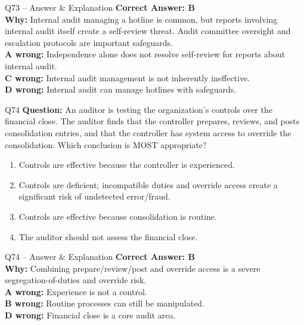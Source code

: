 \documentclass[aspectratio=169,10pt]{beamer}
\begin{document}
	\begin{frame}[t]{Q73 -- Answer \& Explanation}
		\small
		\textbf{Correct Answer: B} \\[4pt]
		\textbf{Why:} Internal audit managing a hotline is common, but reports involving internal audit itself create a self-review threat. Audit committee oversight and escalation protocols are important safeguards. \\[4pt]
		\textbf{A wrong:} Independence alone does not resolve self-review for reports about internal audit. \\[2pt]
		\textbf{C wrong:} Internal audit management is not inherently ineffective. \\[2pt]
		\textbf{D wrong:} Internal audit can manage hotlines with safeguards.
	\end{frame}
	
	\begin{frame}[t]{Q74}
		\small
		\textbf{Question:} An auditor is testing the organization's controls over the financial close. The auditor finds that the controller prepares, reviews, and posts consolidation entries, and that the controller has system access to override the consolidation. Which conclusion is MOST appropriate?
		\begin{enumerate}[label=\Alph*.,itemsep=1pt,topsep=2pt]
			\item Controls are effective because the controller is experienced.
			\item Controls are deficient; incompatible duties and override access create a significant risk of undetected error/fraud.
			\item Controls are effective because consolidation is routine.
			\item The auditor should not assess the financial close.
		\end{enumerate}
	\end{frame}
	
	\begin{frame}[t]{Q74 -- Answer \& Explanation}
		\small
		\textbf{Correct Answer: B} \\[4pt]
		\textbf{Why:} Combining prepare/review/post and override access is a severe segregation-of-duties and override risk. \\[4pt]
		\textbf{A wrong:} Experience is not a control. \\[2pt]
		\textbf{B wrong:} Routine processes can still be manipulated. \\[2pt]
		\textbf{D wrong:} Financial close is a core audit area.
	\end{frame}
	
\end{document}
